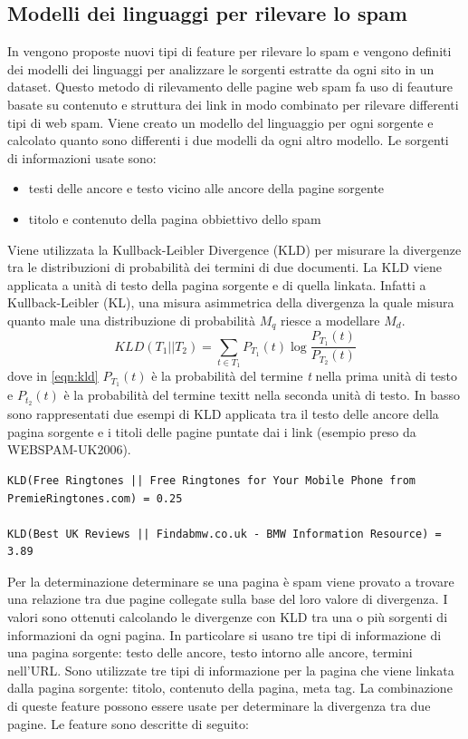 \subsection{Modelli dei linguaggi per rilevare lo spam}
In \cite{Martinez-Romo:2009:WSI:1531914.1531920} vengono proposte nuovi tipi di feature per rilevare lo spam e vengono definiti dei modelli dei linguaggi per analizzare le sorgenti estratte da ogni sito in un dataset.  Questo metodo di rilevamento delle pagine web spam fa uso di feauture basate su contenuto e struttura dei link in modo combinato per rilevare differenti tipi di web spam. Viene creato un modello del linguaggio per ogni sorgente e calcolato quanto sono differenti i due modelli  da ogni altro modello. Le sorgenti di informazioni usate sono: 
\begin{itemize}
\item testi delle ancore e testo vicino alle ancore della pagine sorgente
\item titolo e contenuto della pagina obbiettivo dello spam
\end{itemize}
Viene utilizzata la Kullback-Leibler Divergence (KLD) per misurare la divergenze tra le distribuzioni di probabilità dei termini di due documenti. La KLD viene applicata a unità di testo della pagina sorgente e di quella linkata. Infatti a Kullback-Leibler (KL), una misura  asimmetrica della divergenza la quale misura quanto male una distribuzione di probabilità \(M_q\) riesce a modellare \(M_d\).
\begin{equation}
KLD(T_1||T_2) = \sum_{t \in T_1} P_{T_1}(t) \log \frac{P_{T_1}(t)}{P_{T_2}(t)}
\label{eqn:kld}
\end{equation}
dove in \ref{eqn:kld} \(P_{T_1}(t)\) è la probabilità del termine \textit{t} nella prima unità di testo e \(P_{t_2}(t)\) è la probabilità del termine texit{t} nella seconda unità di testo. In basso sono rappresentati due esempi di KLD applicata tra il testo delle ancore della pagina sorgente e i titoli delle pagine puntate dai i link (esempio preso da WEBSPAM-UK2006).
\begin{lstlisting}[frame=trbl,postbreak=\space, breakindent=5pt, breaklines]
KLD(Free Ringtones || Free Ringtones for Your Mobile Phone from PremieRingtones.com) = 0.25

KLD(Best UK Reviews || Findabmw.co.uk - BMW Information Resource) = 3.89
\end{lstlisting}
Per la determinazione determinare se una pagina è spam viene provato a trovare una relazione tra due pagine collegate sulla base del loro valore di divergenza. I valori sono ottenuti calcolando le divergenze con KLD tra una o più sorgenti di informazioni da ogni pagina. In particolare si usano tre tipi di informazione di una pagina sorgente: testo delle ancore, testo intorno alle ancore, termini nell'URL. Sono utilizzate tre tipi di informazione per la pagina che viene linkata dalla pagina sorgente: titolo, contenuto della pagina, meta tag. La combinazione di queste feature possono essere usate per determinare la divergenza tra due pagine. Le feature sono descritte di seguito:
